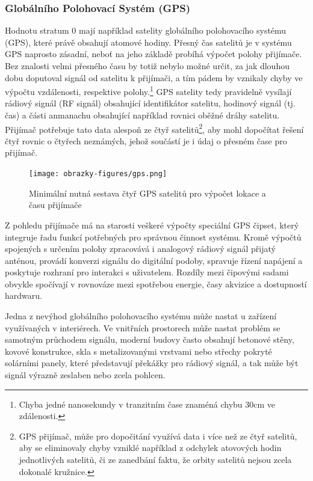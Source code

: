 \subsubsection{Globálního Polohovací Systém (GPS)}
Hodnotu stratum 0 mají například satelity globálního polohovacího systému (GPS), které právě obsahují atomové hodiny. Přesný čas satelitů je v systému GPS naprosto zásadní, neboť na jeho základě probíhá výpočet polohy přijímače. Bez znalosti velmi přesného času by totiž nebylo možné určit, za jak dlouhou dobu doputoval signál od satelitu k přijímači, a tím pádem by vznikaly chyby ve výpočtu vzdálenosti, respektive polohy.\footnote{Chyba jedné nanosekundy v tranzitním čase znaméná chybu 30cm ve zdálenosti.} GPS satelity tedy pravidelně vysílají rádiový signál (RF signál) obsahující identifikátor satelitu, hodinový signál (tj. čas) a části anmanachu obsahující například rovnici oběžné dráhy satelitu. Přijímač potřebuje tato data alespoň ze čtyř satelitů\footnote{GPS přijímač, může pro dopočitání využívá data i více než ze čtyř satelitů, aby se eliminovaly chyby vzniklé například z odchylek atovových hodin jednotlivých satelitů, či ze zanedbání faktu, že orbity satelitů nejsou zcela dokonalé kružnice.}, aby mohl dopočítat řešení čtyř rovnic o čtyřech neznámých, jehož součástí je i údaj o přesném čase pro přijímač. \cite{sparkfun_gps, time_theory_gps}

\begin{figure}[h]
    \centering
    \texttt{[image: obrazky-figures/gps.png]}
    
    \caption{Minimální nutná sestava čtyř GPS satelitů pro výpočet lokace a času přijímače \cite{time_theory_gps}}
    \label{fig:low-power-modes}
\end{figure}

Z pohledu přijímače má na starosti veškeré výpočty speciální GPS čipset, který integruje řadu funkcí potřebných pro správnou činnost systému. Kromě výpočtů spojených s určením polohy zpracovává i analogový rádiový signál přijatý anténou, provádí konverzi signálu do digitální podoby, spravuje řízení napájení a poskytuje rozhraní pro interakci s uživatelem. Rozdíly mezi čipovými sadami obvykle spočívají v rovnováze mezi spotřebou energie, časy akvizice a dostupností hardwaru. \cite{sparkfun_gps}

Jedna z nevýhod globálního polohovacího systému může nastat u zařízení využívaných v interiérech. Ve vnitřních prostorech může nastat problém se samotným průchodem signálu, moderní budovy často obsahují betonové stěny, kovové konstrukce, skla s metalizovanými vrstvami nebo střechy pokryté solárními panely, které představují překážky pro rádiový signál, a tak může být signál výrazně zeslaben nebo zcela pohlcen.

